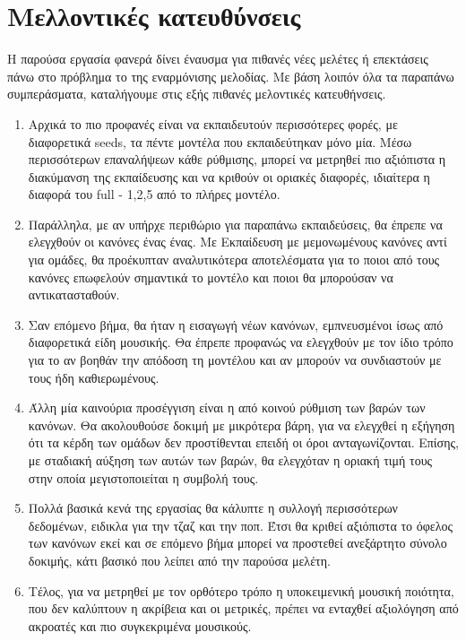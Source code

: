 \section{Μελλοντικές κατευθύνσεις}
Η παρούσα εργασία φανερά δίνει έναυσμα για πιθανές νέες μελέτες ή επεκτάσεις πάνω στο πρόβλημα το της εναρμόνισης μελοδίας. Με βάση λοιπόν όλα τα παραπάνω συμπεράσματα, καταλήγουμε στις εξής πιθανές μελοντικές κατευθήνσεις.

\begin{enumerate}
    \item Αρχικά το πιο προφανές είναι να εκπαιδευτούν περισσότερες φορές, με διαφορετικά seeds, τα πέντε μοντέλα που εκπαιδεύτηκαν μόνο μία. Μέσω περισσότερων επαναλήψεων κάθε ρύθμισης, μπορεί να μετρηθεί πιο αξιόπιστα η διακύμανση της εκπαίδευσης και να κριθούν οι οριακές διαφορές, ιδιαίτερα η διαφορά του full - {1,2,5} από το πλήρες μοντέλο.
    \item Παράλληλα, με αν υπήρχε περιθώριο για παραπάνω εκπαιδεύσεις, θα έπρεπε να ελεγχθούν οι κανόνες ένας ένας. Με Εκπαίδευση με μεμονωμένους κανόνες αντί για ομάδες, θα προέκυπταν αναλυτικότερα αποτελέσματα για το ποιοι από τους κανόνες επωφελούν σημαντικά το μοντέλο και ποιοι θα μπορούσαν να αντικατασταθούν.
    \item Σαν επόμενο βήμα, θα ήταν η εισαγωγή νέων κανόνων, εμπνευσμένοι ίσως από διαφορετικά είδη μουσικής. Θα έπρεπε προφανώς να ελεγχθούν με τον ίδιο τρόπο για το αν βοηθάν την απόδοση τη μοντέλου και αν μπορούν να συνδιαστούν με τους ήδη καθιερωμένους.
    \item Άλλη μία καινούρια προσέγγιση είναι η από κοινού ρύθμιση των βαρών των κανόνων. Θα ακολουθούσε δοκιμή με μικρότερα βάρη, για να ελεγχθεί η εξήγηση ότι τα κέρδη των ομάδων δεν προστίθενται επειδή οι όροι ανταγωνίζονται. Επίσης, με σταδιακή αύξηση των αυτών των βαρών, θα ελεγχόταν η οριακή τιμή τους στην οποία μεγιστοποιείται η συμβολή τους.
    \item Πολλά βασικά κενά της εργασίας θα κάλυπτε η συλλογή περισσότερων δεδομένων, ειδικλα για την τζαζ και την ποπ. Έτσι θα κριθεί αξιόπιστα το όφελος των κανόνων εκεί και σε επόμενο βήμα μπορεί να προστεθεί ανεξάρτητο σύνολο δοκιμής, κάτι βασικό που λείπει από την παρούσα μελέτη.
    \item Τέλος, για να μετρηθεί με τον ορθότερο τρόπο η υποκειμενική μουσική ποιότητα, που δεν καλύπτουν η ακρίβεια και οι μετρικές, πρέπει να ενταχθεί αξιολόγηση από ακροατές και πιο συγκεκριμένα μουσικούς. 
\end{enumerate}
